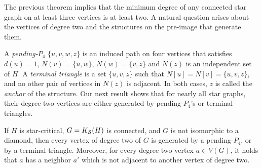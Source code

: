The previous theorem implies that the minimum degree of any connected star graph on at least three vertices is at least two.
A natural question arises about the vertices of degree two and the structures on the pre-image that generate them.

A \textit{pending-$P_4$} $\{u, v, w, z\}$ is an induced path on four vertices that satisfies $d(u) = 1$, $N(v) = \{u, w\}$, $N(w) = \{v, z\}$ and $N(z)$ is an independent set of $H$.
A \textit{terminal triangle} is a set $\{u, v, z\}$ such that $N[u] = N[v] = \{u,v,z\}$, and no other pair of vertices in $N(z)$ is adjacent.
In both cases, $z$ is called the \textit{anchor} of the structure.
Our next result shows that for nearly all star graphs, their degree two vertices are either generated by pending-$P_4$'s or terminal triangles.

\begin{lemma}
    If $H$ is star-critical, $G = K_{\mathcal{S}}(H)$ is connected, and $G$ is not isomorphic to a diamond, then every vertex of degree two of $G$ is generated by a pending-$P_4$,
    or by a terminal triangle.
    Moreover, for every degree two vertex $a \in V(G)$, it holds that $a$ has a neighbor $a'$ which is not adjacent to another vertex of degree two.
\end{lemma}

